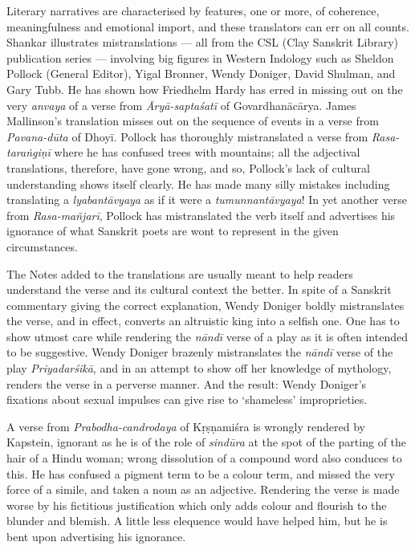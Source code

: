 Literary narratives are characterised by features, one or more, of coherence, meaningfulness and emotional import, and these translators can err on all counts. Shankar illustrates mistranslations --- all from the CSL (Clay Sanskrit Library) publication series --- involving big figures in Western Indology such as Sheldon Pollock (General Editor), Yigal Bronner, Wendy Doniger, David Shulman, and Gary Tubb. He has shown how Friedhelm Hardy has erred in missing out on the very \textsl{anvaya} of a verse from \textsl{Āryā-saptaśatī} of Govardhanācārya. James Mallinson’s translation misses out on the sequence of events in a verse from \textsl{Pavana-dūta} of Dhoyī. Pollock has thoroughly mistranslated a verse from \textsl{Rasa-taraṅgiṇī} where he has confused trees with mountains; all the adjectival translations, therefore, have gone wrong, and so, Pollock’s lack of cultural understanding shows itself clearly. He has made many silly mistakes including translating a \textsl{lyabantāvyaya} as if it were a \textsl{tumunnantāvyaya}! In yet another verse from \textsl{Rasa-mañjarī}, Pollock has mistranslated the verb itself and advertises his ignorance of what Sanskrit poets are wont to represent in the given circumstances.

The Notes added to the translations are usually meant to help readers understand the verse and its cultural context the better. In spite of a Sanskrit commentary giving the correct explanation, Wendy Doniger
 boldly mistranslates the verse, and in effect, converts an altruistic king into a selfish one. One has to show utmost care while rendering the \textsl{nāndī} verse of a play as it is often intended to be suggestive. Wendy Doniger brazenly mistranslates the \textsl{nāndī} verse of the play \textsl{Priyadarśikā}, and in an attempt to show off her knowledge of mythology, renders the verse in a perverse manner. And the result: Wendy Doniger’s fixations about sexual impulses can give rise to ‘shameless’ improprieties.

A verse from \textsl{Prabodha-candrodaya} of Kṛṣṇamiśra is wrongly rendered by Kapstein, ignorant as he is of the role of \textsl{sindūra} at the spot of the parting of the hair of a Hindu woman; wrong dissolution of a compound word also conduces to this. He has confused a pigment term to be a colour term, and missed the very force of a simile, and taken a noun as an adjective. Rendering the verse is made worse by his fictitious justification which only adds colour and flourish to the blunder and blemish. A little less elequence would have helped him, but he is bent upon advertising his ignorance.

